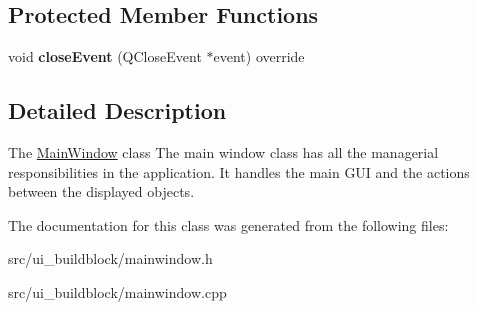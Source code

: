 \subsection*{Protected Member Functions}
\begin{DoxyCompactItemize}
\item 
\mbox{\label{classMainWindow_a05fb9d72c044aa3bb7d187b994704e2f}} 
void {\bfseries close\+Event} (Q\+Close\+Event $\ast$event) override
\end{DoxyCompactItemize}


\subsection{Detailed Description}
The \mbox{\hyperlink{classMainWindow}{Main\+Window}} class The main window class has all the managerial responsibilities in the application. It handles the main G\+UI and the actions between the displayed objects. 

The documentation for this class was generated from the following files\+:\begin{DoxyCompactItemize}
\item 
src/ui\+\_\+buildblock/mainwindow.\+h\item 
src/ui\+\_\+buildblock/mainwindow.\+cpp\end{DoxyCompactItemize}

